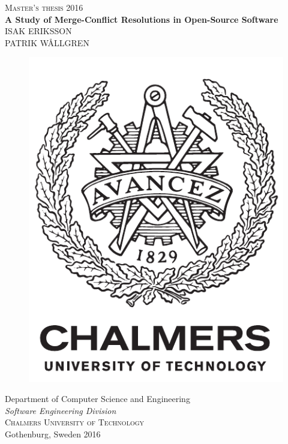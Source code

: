 \newpage
\thispagestyle{empty}
\begin{center}
	\textsc{\large Master's thesis 2016}\\[4cm]		%
	\textbf{\Large A Study of Merge-Conflict Resolutions in Open-Source Software} \\[1cm]
	{\large }
	{\large ISAK ERIKSSON\\PATRIK WÅLLGREN}
	
	\vfill	
	\begin{figure}[H]
	\centering
	\includegraphics[width=0.2\pdfpagewidth]{figure/auxiliary/logo_eng.pdf} \\	
	\end{figure}	\vspace{5mm}	
	
	Department of Computer Science and Engineering \\
	\emph{Software Engineering Division}\\
	\textsc{Chalmers University of Technology} \\
	Gothenburg, Sweden 2016 \\
\end{center}


